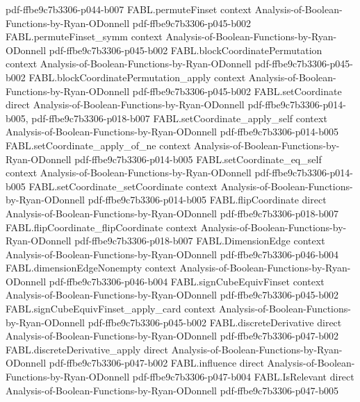 \begin{theorem}
  {pdf-ffbe9c7b3306-p044-b007}
\proofstep
  {FABL.permuteFinset}
  {context}
  {Analysis-of-Boolean-Functions-by-Ryan-ODonnell}
  {pdf-ffbe9c7b3306-p045-b002}
\proofstep
  {FABL.permuteFinset_symm}
  {context}
  {Analysis-of-Boolean-Functions-by-Ryan-ODonnell}
  {pdf-ffbe9c7b3306-p045-b002}
\proofstep
  {FABL.blockCoordinatePermutation}
  {context}
  {Analysis-of-Boolean-Functions-by-Ryan-ODonnell}
  {pdf-ffbe9c7b3306-p045-b002}
\proofstep
  {FABL.blockCoordinatePermutation_apply}
  {context}
  {Analysis-of-Boolean-Functions-by-Ryan-ODonnell}
  {pdf-ffbe9c7b3306-p045-b002}
\proofstep
  {FABL.setCoordinate}
  {direct}
  {Analysis-of-Boolean-Functions-by-Ryan-ODonnell}
  {pdf-ffbe9c7b3306-p014-b005,
    pdf-ffbe9c7b3306-p018-b007}
\proofstep
  {FABL.setCoordinate_apply_self}
  {context}
  {Analysis-of-Boolean-Functions-by-Ryan-ODonnell}
  {pdf-ffbe9c7b3306-p014-b005}
\proofstep
  {FABL.setCoordinate_apply_of_ne}
  {context}
  {Analysis-of-Boolean-Functions-by-Ryan-ODonnell}
  {pdf-ffbe9c7b3306-p014-b005}
\proofstep
  {FABL.setCoordinate_eq_self}
  {context}
  {Analysis-of-Boolean-Functions-by-Ryan-ODonnell}
  {pdf-ffbe9c7b3306-p014-b005}
\proofstep
  {FABL.setCoordinate_setCoordinate}
  {context}
  {Analysis-of-Boolean-Functions-by-Ryan-ODonnell}
  {pdf-ffbe9c7b3306-p014-b005}
\proofstep
  {FABL.flipCoordinate}
  {direct}
  {Analysis-of-Boolean-Functions-by-Ryan-ODonnell}
  {pdf-ffbe9c7b3306-p018-b007}
\proofstep
  {FABL.flipCoordinate_flipCoordinate}
  {context}
  {Analysis-of-Boolean-Functions-by-Ryan-ODonnell}
  {pdf-ffbe9c7b3306-p018-b007}
\proofstep
  {FABL.DimensionEdge}
  {context}
  {Analysis-of-Boolean-Functions-by-Ryan-ODonnell}
  {pdf-ffbe9c7b3306-p046-b004}
\proofstep
  {FABL.dimensionEdgeNonempty}
  {context}
  {Analysis-of-Boolean-Functions-by-Ryan-ODonnell}
  {pdf-ffbe9c7b3306-p046-b004}
\proofstep
  {FABL.signCubeEquivFinset}
  {context}
  {Analysis-of-Boolean-Functions-by-Ryan-ODonnell}
  {pdf-ffbe9c7b3306-p045-b002}
\proofstep
  {FABL.signCubeEquivFinset_apply_card}
  {context}
  {Analysis-of-Boolean-Functions-by-Ryan-ODonnell}
  {pdf-ffbe9c7b3306-p045-b002}
\proofstep
  {FABL.discreteDerivative}
  {direct}
  {Analysis-of-Boolean-Functions-by-Ryan-ODonnell}
  {pdf-ffbe9c7b3306-p047-b002}
\proofstep
  {FABL.discreteDerivative_apply}
  {direct}
  {Analysis-of-Boolean-Functions-by-Ryan-ODonnell}
  {pdf-ffbe9c7b3306-p047-b002}
\proofstep
  {FABL.influence}
  {direct}
  {Analysis-of-Boolean-Functions-by-Ryan-ODonnell}
  {pdf-ffbe9c7b3306-p047-b004}
\proofstep
  {FABL.IsRelevant}
  {direct}
  {Analysis-of-Boolean-Functions-by-Ryan-ODonnell}
  {pdf-ffbe9c7b3306-p047-b005}

\end{theorem}
